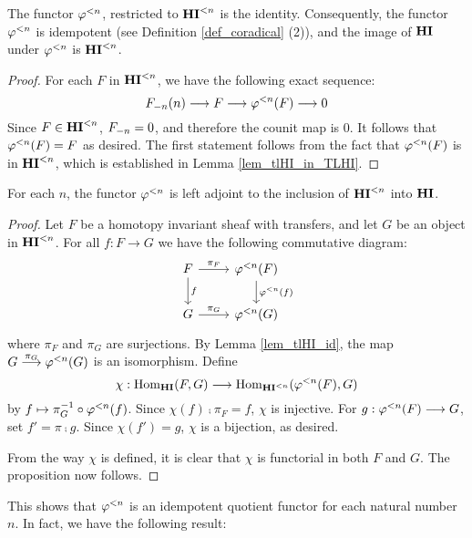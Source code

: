 \begin{lem}\label{lem_tlHI_id}
The functor $\tlHI{n}$, restricted to $\TFHI{n}$ is the 
identity. Consequently, the functor $\tlHI{n}$ is idempotent
(see Definition \ref{def_coradical} (2)), and the image of $\HI$ 
under $\tlHI{n}$ is $\TFHI{n}$.
\end{lem}
\begin{proof}
For each $F$ in $\TFHI{n}$, we have the following exact sequence:
\[
\LHI[n]{\RHI[n]{F}} \to F \to \tlHI{n}(F) \to 0
\]
Since $F \in \TFHI{n}$, $\RHI[n]{F} = 0$, and therefore the counit
map is $0$. It follows that $\tlHI{n}(F) = F$ as desired. The 
first statement follows from the fact that $\tlHI{n}(F)$ is in
$\TLHI{n}{\HI}$, which is established in Lemma \ref{lem_tlHI_in_TLHI}.
\end{proof}

\begin{prop}\label{prop_HI_lower_slice}
For each $n$, the functor $\tlHI{n}$ is left adjoint to the 
inclusion of $\TLHI{n}{\HI}$ into $\HI$.
\end{prop}
\begin{proof}
Let $F$ be a homotopy invariant sheaf with transfers, and let $G$ 
be an object in $\TLHI{n}{\HI}$. For all $f: F \to G$ we have the 
following commutative diagram:
\[
\begin{tikzcd}
F \arrow{r}{\pi_F} \arrow{d}{f}
& \tlHI{n}(F) \arrow{d}{\tlHI{n}(f)} \\
G \arrow{r}{\pi_G}
& \tlHI{n}(G) 
\end{tikzcd}
\]
where $\pi_F$ and $\pi_G$ are surjections. By Lemma \ref{lem_tlHI_id},
the map $G \stackrel{\pi_G}{\to} \tlHI{n}(G)$ is an
isomorphism. Define
\[
\chi : \homHI(F, G) \to \hom_{\TLHI{n}{\HI}}(\tlHI{n}(F), G)
\]
by $f \mapsto \pi_G^{-1} \circ \tlHI{n}(f)$. Since $\chi(f) \comp 
\pi_F = f$, $\chi$ is injective. For $g: \tlHI{n}(F) \to G$, set 
$f' = \pi \comp g$. Since $\chi(f') = g$, $\chi$ is a bijection, 
as desired.

From the way $\chi$ is defined, it is clear that $\chi$ is 
functorial in both $F$ and $G$. The proposition now follows.
\end{proof}

This shows that $\tlHI{n}$ is an idempotent quotient functor
for each natural number $n$. In fact, we have the following 
result:

